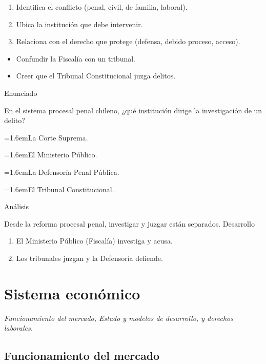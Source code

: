\documentclass[10pt,a4paper,twocolumn]{article}
\newcommand{\alternativa}[2]{\par\noindent\hangindent=1.6em\hangafter=1\makebox[1.6em][l]{\tecla{#1}}#2\par}
\newcommand{\clave}[1]{\par\smallskip{\sffamily\footnotesize\color{esmeralda} Clave \teclaok{#1}}\par}
\begin{document}
\begin{metodo}
\begin{enumerate}
  \item Identifica el conflicto (penal, civil, de familia, laboral).
  \item Ubica la institución que debe intervenir.
  \item Relaciona con el derecho que protege (defensa, debido proceso, acceso).
\end{enumerate}
\end{metodo}

\begin{errorfrecuente}
\begin{itemize}
  \item Confundir la Fiscalía con un tribunal.
  \item Creer que el Tribunal Constitucional juzga delitos.
\end{itemize}
\end{errorfrecuente}

\begin{ejemplo}
{\sffamily\footnotesize\color{zinc500} Enunciado}\par
En el sistema procesal penal chileno, ¿qué institución dirige la investigación de un delito?
\alternativa{A}{La Corte Suprema.}
\alternativa{B}{El Ministerio Público.}
\alternativa{C}{La Defensoría Penal Pública.}
\alternativa{D}{El Tribunal Constitucional.}
\clave{B}
{\sffamily\footnotesize\color{zinc500} Análisis}\par Desde la reforma procesal penal, investigar y juzgar están separados.
{\sffamily\footnotesize\color{zinc500} Desarrollo}
\begin{enumerate}
  \item El Ministerio Público (Fiscalía) investiga y acusa.
  \item Los tribunales juzgan y la Defensoría defiende.
\end{enumerate}
\end{ejemplo}

\section{Sistema económico}

{\itshape\color{zinc700} Funcionamiento del mercado, Estado y modelos de desarrollo, y derechos laborales.}

\subsection{Funcionamiento del mercado}
\end{document}
